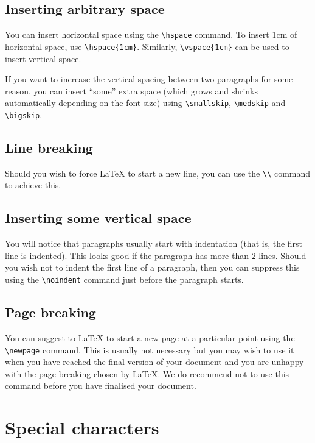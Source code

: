 \documentclass[12pt,a4paper]{article}
\begin{document}
\subsection{Inserting arbitrary space}

You can insert horizontal space using the \verb:\hspace: command. To
insert 1cm of horizontal space, use \verb:\hspace{1cm}:. Similarly,
\verb:\vspace{1cm}: can be used to insert vertical space.

If you want to increase the vertical spacing between two paragraphs
for some reason, you can insert ``some'' extra space (which grows and
shrinks automatically depending on the font size) using
\verb:\smallskip:, \verb:\medskip: and \verb:\bigskip:.


\subsection{Line breaking}
Should you wish to force \LaTeX{} to start a new line, you can use the
\verb:\\: command to achieve this.


\subsection{Inserting some vertical space}

You will notice that paragraphs usually start with indentation (that
is, the first line is indented). This looks good if the paragraph has 
more than 2 lines. Should you wish not to indent the first line of a
paragraph, then you can suppress this using the \verb:\noindent:
command just before the paragraph starts.

\subsection{Page breaking}

You can suggest to \LaTeX{} to start a new page at a particular point
using the \verb:\newpage: command. This is usually not necessary but
you may wish to use it when you have reached the final version of your
document and you are unhappy with the page-breaking chosen by LaTeX{}.
We do recommend not to use this command before you have finalised your
document.



\section{Special characters}
\label{sec:special}
\end{document}

